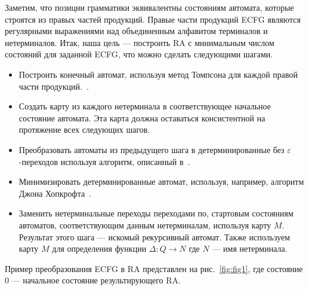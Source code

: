 \documentclass[14pt]{matmex-diploma-custom}
\begin{document}
	Заметим, что позиции грамматики эквивалентны состояниям автомата, которые 
	строятся из правых частей продукций. Правые части продукций ECFG являются регулярными
	выражениями над объединенным алфавитом терминалов и нетерминалов. Итак, наша цель ---
	построить RA с минимальным числом состояний для заданной ECFG, что можно сделать следующими шагами.
	\begin{itemize}
		\item Построить конечный автомат, используя метод Томпсона для каждой правой
		части продукций.~\cite{Thompson:1968:PTR:363347.363387}.
		\item Создать карту из каждого нетерминала в соответствующее начальное состояние автомата.
		Эта карта должна оставаться консистентной на протяжение всех следующих шагов.
		\item Преобразовать автоматы из предыдущего шага в детерминированные без 
		$\varepsilon$-переходов используя алгоритм, описанный в~\cite{aho1974design}.
		\item Минимизировать детерминированные автомат, используя, например, алгоритм
		Джона Хопкрофта~\cite{hopcroft1971n}.
		\item Заменить нетерминальные переходы переходами по, стартовым состояниям автоматов,
		соответствующим данным нетерминалам, используя карту $M$. Результат 
		этого шага --- искомый рекурсивный автомат. Также используем карту $M$
		для определения функции $\Delta : Q \to N$ где $N$ --- имя нетерминала.
	\end{itemize}
	Пример преобразования ECFG в RA представлен на рис.~\ref{fig:fig1}, где состояние
	0 --- начальное состояние результирующего RA.
\end{document}
